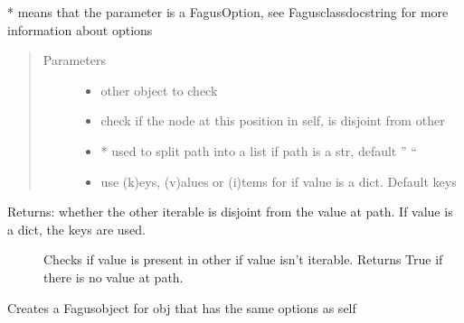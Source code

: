 \documentclass[a4paper,10pt,english]{sphinxmanual}
\begin{document}
\begin{fulllineitems}
\begin{fulllineitems}
\sphinxAtStartPar
* means that the parameter is a FagusOption, see Fagus\sphinxhyphen{}class\sphinxhyphen{}docstring for more information about options
\begin{quote}\begin{description}
\item[{Parameters}] \leavevmode\begin{itemize}
\item {}
\sphinxAtStartPar
{} \textendash{} other object to check

\item {}
\sphinxAtStartPar
{} \textendash{} check if the node at this position in self, is disjoint from other

\item {}
\sphinxAtStartPar
{} \textendash{} * used to split path into a list if path is a str, default ” “

\item {}
\sphinxAtStartPar
{} \textendash{} use (k)eys, (v)alues or (i)tems for if value is a dict. Default keys

\end{itemize}

\end{description}\end{quote}
\begin{description}
\item[{Returns: whether the other iterable is disjoint from the value at path. If value is a dict, the keys are used.}] \leavevmode
\sphinxAtStartPar
Checks if value is present in other if value isn’t iterable. Returns True if there is no value at path.

\end{description}

\end{fulllineitems}


\begin{fulllineitems}
\label{\detokenize{fagus.fagus:fagus.fagus.Fagus.child}}
\pysigstartsignatures
{}
\pysigstopsignatures
\sphinxAtStartPar
Creates a Fagus\sphinxhyphen{}object for obj that has the same options as self


\end{fulllineitems}
\end{fulllineitems}
\end{document}
